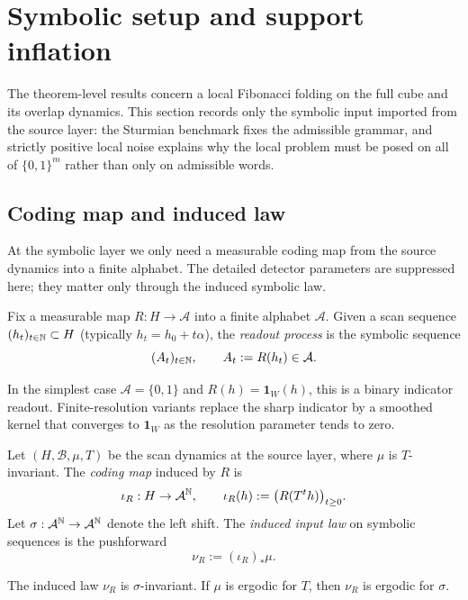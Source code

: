\section{Symbolic setup and support inflation}\label{sec:readout}

The theorem-level results concern a local Fibonacci folding on the full cube and its overlap dynamics. This section records only the symbolic input imported from the source layer: the Sturmian benchmark fixes the admissible grammar, and strictly positive local noise explains why the local problem must be posed on all of $\{0,1\}^m$ rather than only on admissible words.

\subsection{Coding map and induced law}\label{sec:readout:maps}

At the symbolic layer we only need a measurable coding map from the source dynamics into a finite alphabet. The detailed detector parameters are suppressed here; they matter only through the induced symbolic law.

\begin{definition}\label{def:readout}
Fix a measurable map $R:H\to\mathcal{A}$ into a finite alphabet $\mathcal{A}$. Given a scan sequence $(h_t)_{t\in\mathbb{N}}\subset H$ (typically $h_t=h_0+t\alpha$), the \emph{readout process} is the symbolic sequence
\[
(A_t)_{t\in\mathbb{N}},\qquad A_t:=R(h_t)\in\mathcal{A}.
\]
\end{definition}

In the simplest case $\mathcal{A}=\{0,1\}$ and $R(h)=\mathbf{1}_W(h)$, this is a binary indicator readout. Finite-resolution variants replace the sharp indicator by a smoothed kernel that converges to $\mathbf{1}_W$ as the resolution parameter tends to zero.

\begin{definition}\label{def:coding-law}
Let $(H,\mathcal{B},\mu,T)$ be the scan dynamics at the source layer, where $\mu$ is $T$-invariant. The \emph{coding map} induced by $R$ is
\[
\iota_R:H\to\mathcal{A}^{\mathbb{N}},\qquad
\iota_R(h):=\bigl(R(T^t h)\bigr)_{t\ge 0}.
\]
Let $\sigma:\mathcal{A}^{\mathbb{N}}\to\mathcal{A}^{\mathbb{N}}$ denote the left shift. The \emph{induced input law} on symbolic sequences is the pushforward
\[
\nu_R:=(\iota_R)_*\mu.
\]
\end{definition}

\begin{proposition}\label{prop:induced-law}
The induced law $\nu_R$ is $\sigma$-invariant. If $\mu$ is ergodic for $T$, then $\nu_R$ is ergodic for $\sigma$.
\end{proposition}

